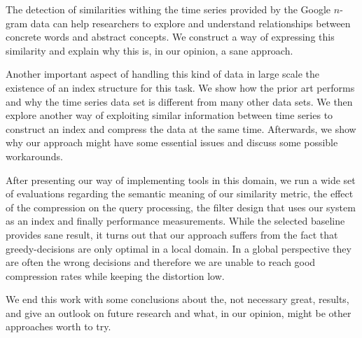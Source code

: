 \Abstract{}

The detection of similarities withing the time series provided by the Google $n$-gram data can help researchers to explore and understand relationships between concrete words and abstract concepts. We construct a way of expressing this similarity and explain why this is, in our opinion, a sane approach.

Another important aspect of handling this kind of data in large scale the existence of an index structure for this task. We show how the prior art performs and why the time series data set is different from many other data sets. We then explore another way of exploiting similar information between time series to construct an index and compress the data at the same time. Afterwards, we show why our approach might have some essential issues and discuss some possible workarounds.

After presenting our way of implementing tools in this domain, we run a wide set of evaluations regarding the semantic meaning of our similarity metric, the effect of the compression on the query processing, the filter design that uses our system as an index and finally performance measurements. While the selected baseline provides sane result, it turns out that our approach suffers from the fact that greedy-decisions are only optimal in a local domain. In a global perspective they are often the wrong decisions and therefore we are unable to reach good compression rates while keeping the distortion low.

We end this work with some conclusions about the, not necessary great, results, and give an outlook on future research and what, in our opinion, might be other approaches worth to try.
